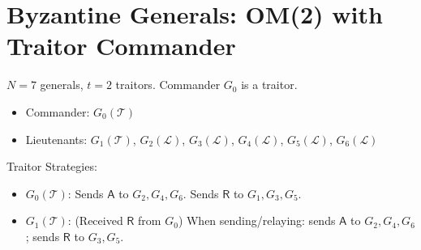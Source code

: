 \documentclass{article}[12pt]
\newcommand{\cmdA}{\ensuremath{\mathsf{A}}} %
\newcommand{\cmdR}{\ensuremath{\mathsf{R}}} %
\newcommand{\loyal}{\ensuremath{\mathcal{L}}}
\newcommand{\traitor}{\ensuremath{\mathcal{T}}}
\newcommand{\gen}[1]{\ensuremath{G_{#1}}}
\begin{document}
\section*{Byzantine Generals: OM(2) with Traitor Commander}
$N=7$ generals, $t=2$ traitors. Commander $\gen{0}$ is a traitor.
\begin{itemize}
    \item Commander: $\gen{0}(\traitor)$
    \item Lieutenants: $\gen{1}(\traitor)$, $\gen{2}(\loyal)$, $\gen{3}(\loyal)$, $\gen{4}(\loyal)$, $\gen{5}(\loyal)$, $\gen{6}(\loyal)$
\end{itemize}
Traitor Strategies:
\begin{itemize}
    \item $\gen{0}(\traitor)$: Sends \cmdA{} to $\gen{2},\gen{4},\gen{6}$. Sends \cmdR{} to $\gen{1},\gen{3},\gen{5}$.
    \item $\gen{1}(\traitor)$: (Received \cmdR{} from $\gen{0}$) When sending/relaying: sends \cmdA{} to $\gen{2},\gen{4},\gen{6}$; sends \cmdR{} to $\gen{3},\gen{5}$.
\end{itemize}
\end{document}
